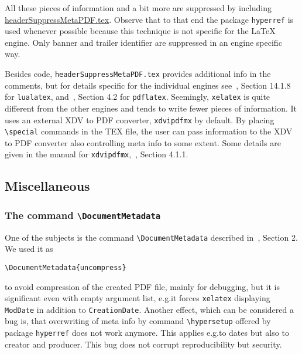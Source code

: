 \documentclass[a4paper, english]{article}%
\newcommand{\pdflatex}{\texttt{pdflatex}}
\newcommand{\lualatex}{\texttt{lualatex}}
\newcommand{\xelatex}{\texttt{xelatex}}
\newcommand{\cmd}[1]{\texttt{\textbackslash#1}}
\begin{document}
\begin{description}
\end{description}

All these pieces of information 
and a bit more are suppressed 
by including \href{\urlSite fromTex/headerSuppressMetaPDF.tex}{headerSuppressMetaPDF.tex}. 
Observe that to that end the package \texttt{hyperref} is used 
whenever possible because this technique is not specific for the \LaTeX{} engine. 
Only banner and trailer identifier are suppressed in an engine specific way. 

Besides code, \texttt{headerSuppressMetaPDF.tex} provides 
additional info in the comments, 
but for details specific for the individual engines 
see~\cite{LuaTexRef24}, Section 14.1.8 for \lualatex, 
and~\cite{PdfTexUsr24}, Section 4.2 for \pdflatex. 
Seemingly, \xelatex{} is quite different from the other engines 
and tends to write fewer pieces of information. 
It uses an external XDV to PDF converter, \texttt{xdvipdfmx} by default. 
By placing \cmd{special} commands in the TEX file, 
the user can pass information to the XDV to PDF converter 
also controlling meta info to some extent. 
Some details are given in the 
manual for \texttt{xdvipdfmx},~\cite{DviPdfMx}, Section 4.1.1. 



\subsection{Miscellaneous}\label{subsec:misc}

\subsubsection{The command \cmd{DocumentMetadata}}\label{subsubsec:docMeta}

One of the subjects is the command \cmd{DocumentMetadata} 
described in~\cite{DocMetaDataSuppCode}, Section 2. 
We used it as 
%
\begin{verbatim}
\DocumentMetadata{uncompress}
\end{verbatim}
%
to avoid compression of the created PDF file, mainly for debugging, 
but it is significant even with empty argument list, 
e.g.\@ it forces \xelatex{} displaying \texttt{ModDate} in addition to \texttt{CreationDate}. 
Another effect, which can be considered a bug is, 
that overwriting of meta info by command \cmd{hypersetup} offered by package \texttt{hyperref} 
does not work anymore. 
This applies e.g.\@ to dates but also to creator and producer. 
This bug does not corrupt reproducibility but security. 
\end{document}

